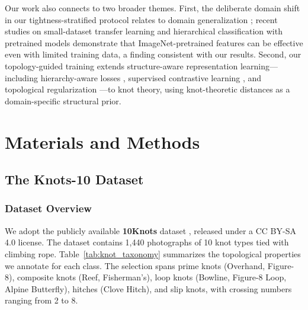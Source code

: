 \documentclass[preprint,review,12pt]{elsarticle}
\begin{document}
Our work also connects to two broader themes. First, the deliberate domain shift in our tightness-stratified protocol relates to domain generalization \citep{zhou2022domain}; recent studies on small-dataset transfer learning \citep{an2021hierarchical} and hierarchical classification with pretrained models \citep{kim2025hierarchical} demonstrate that ImageNet-pretrained features can be effective even with limited training data, a finding consistent with our results. Second, our topology-guided training extends structure-aware representation learning---including hierarchy-aware losses \citep{barz2019hierarchy}, supervised contrastive learning \citep{khosla2020supcon}, and topological regularization \citep{carlsson2020topological}---to knot theory, using knot-theoretic distances as a domain-specific structural prior.


\section{Materials and Methods}\label{sec:methods}

\subsection{The Knots-10 Dataset}\label{sec:dataset}

\subsubsection{Dataset Overview}

We adopt the publicly available \textbf{10Knots} dataset \citep{cameron2018tenknots}, released under a CC BY-SA 4.0 license. The dataset contains 1{,}440 photographs of 10 knot types tied with climbing rope. Table~\ref{tab:knot_taxonomy} summarizes the topological properties we annotate for each class. The selection spans prime knots (Overhand, Figure-8), composite knots (Reef, Fisherman's), loop knots (Bowline, Figure-8 Loop, Alpine Butterfly), hitches (Clove Hitch), and slip knots, with crossing numbers ranging from 2 to 8.
\end{document}
